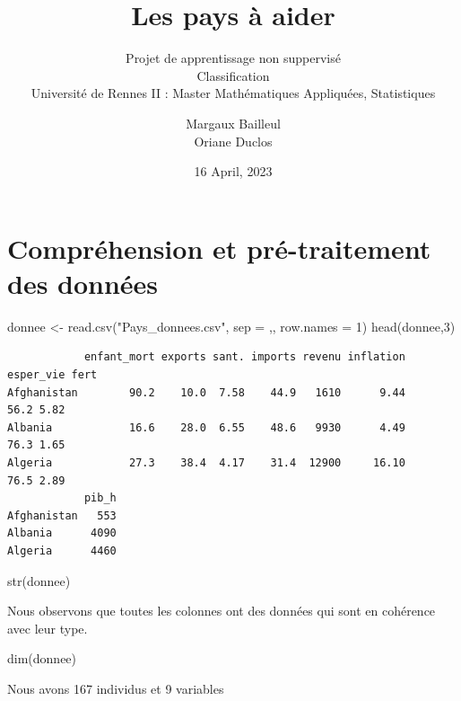 \documentclass[
]{article}
\title{Les pays à aider}
\subtitle{Projet de apprentissage non suppervisé\\
Classification\\
Université de Rennes II : Master Mathématiques Appliquées, Statistiques}
\author{Margaux Bailleul\\
Oriane Duclos}
\date{16 April, 2023}
\newenvironment{Shaded}{}{}
\newcommand{\AttributeTok}[1]{#1}
\newcommand{\DecValTok}[1]{#1}
\newcommand{\FunctionTok}[1]{#1}
\newcommand{\NormalTok}[1]{#1}
\newcommand{\OtherTok}[1]{\textcolor[rgb]{1.00,0.25,0.00}{#1}}
\newcommand{\StringTok}[1]{\textcolor[rgb]{0.00,0.50,0.50}{#1}}
\begin{document}
\maketitle

{
\setcounter{tocdepth}{2}
\tableofcontents
}
\hypertarget{compruxe9hension-et-pruxe9-traitement-des-donnuxe9es}{%
\section{Compréhension et pré-traitement des
données}\label{compruxe9hension-et-pruxe9-traitement-des-donnuxe9es}}

\begin{Shaded}
\begin{Highlighting}[]
\NormalTok{donnee }\OtherTok{\textless{}{-}} \FunctionTok{read.csv}\NormalTok{(}\StringTok{"Pays\_donnees.csv"}\NormalTok{, }\AttributeTok{sep =} \StringTok{\textquotesingle{},\textquotesingle{}}\NormalTok{, }\AttributeTok{row.names =} \DecValTok{1}\NormalTok{)}
\FunctionTok{head}\NormalTok{(donnee,}\DecValTok{3}\NormalTok{)}
\end{Highlighting}
\end{Shaded}

\begin{verbatim}
            enfant_mort exports sant. imports revenu inflation esper_vie fert
Afghanistan        90.2    10.0  7.58    44.9   1610      9.44      56.2 5.82
Albania            16.6    28.0  6.55    48.6   9930      4.49      76.3 1.65
Algeria            27.3    38.4  4.17    31.4  12900     16.10      76.5 2.89
            pib_h
Afghanistan   553
Albania      4090
Algeria      4460
\end{verbatim}

\begin{Shaded}
\begin{Highlighting}[]
\FunctionTok{str}\NormalTok{(donnee)}
\end{Highlighting}
\end{Shaded}

Nous observons que toutes les colonnes ont des données qui sont en
cohérence avec leur type.

\begin{Shaded}
\begin{Highlighting}[]
\FunctionTok{dim}\NormalTok{(donnee)}
\end{Highlighting}
\end{Shaded}

Nous avons 167 individus et 9 variables
\end{document}
